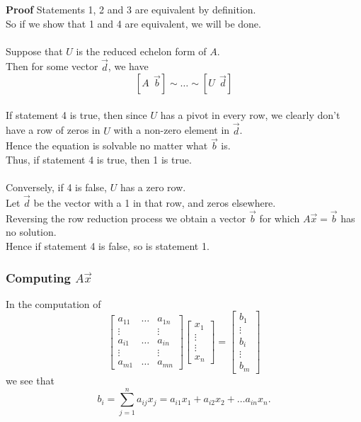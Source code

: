   \begin{frame}[fragile]
\textbf{Proof}
Statements 1, 2 and 3 are equivalent by definition. \\ 
So if we show that 1 and 4 are 
equivalent, we will be done.  \\ 

\ \\
Suppose that $U$ is the reduced echelon form of $A$.  \\ 
Then for some vector $\vec{d}$, we have
\[
  [ A\ \  \vec{b}] \sim \dots \sim [ U \ \ \vec{d} ]
\]  \\ 
If statement 4 is true, then since $U$ has a pivot in every row,
we clearly don't have a row of zeros in $U$ with a non-zero element in $\vec{d}$. \\ 
Hence the equation is solvable no matter what $\vec{b}$ is.  \\  
Thus, if statement 4 is true, then 1 is true.  \\ 

\ \\ 
Conversely, if 4 is false, $U$ has a zero row.   \\ 
Let $\vec{d}$ be the vector with a 
1 in that row, and zeros elsewhere.  \\ 
Reversing the row reduction process we obtain a
vector $\vec{b}$ for which $A \vec{x} = \vec{b}$ has no solution.   \\ 
Hence if statement 4 is false, so is statement 1.

\end{frame}

  \begin{frame}[fragile]\frametitle{Computing $A\vec{x}$}
In the computation of 
\[
 \left[\begin{array}{ccc}
  a_{11} & \dots & a_{1n}\\
  \vdots &       & \vdots \\
  a_{i1} & \dots & a_{in} \\
  \vdots &       & \vdots \\
  a_{m1} & \dots & a_{mn}
 \end{array}\right]
\left[\begin{array}{c} x_1 \\ \vdots \\ \vdots \\x_n \end{array}\right] 
=
\left[\begin{array}{c}
 b_1 \\ \vdots\\ b_i \\ \vdots \\ b_m 
\end{array}\right]
\]
we see that 
$$b_i = \sum_{j=1}^n a_{i j}x_j = a_{i1} x_1 + a_{i2} x_2 + \dots a_{in} x_n. $$
\end{frame}

